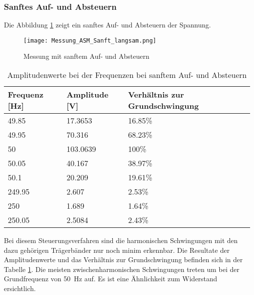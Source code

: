 \newpage
\subsubsection*{Sanftes Auf- und Absteuern}

Die Abbildung \ref{fig:Mess_ASM_Sanft_langsam} zeigt ein sanftes Auf- und Absteuern der Spannung.

\begin{figure}[ht!]
	\centering
	\texttt{[image: Messung\_ASM\_Sanft\_langsam.png]}	
	\caption{Messung mit sanftem Auf- und Absteuern}\label{fig:Mess_ASM_Sanft_langsam}
\end{figure}


\begin{table}[ht!]
	\centering
	\begin{tabular}{|l|l|l|}
		\hline
		Frequenz {[}Hz{]} & Amplitude {[}V{]} & Verhältnis zur Grundschwingung \\ \hline
		49.85             & 17.3653           & 16.85\%                        \\ \hline
		49.95             & 70.316            & 68.23\%                        \\ \hline
		50                & 103.0639          & 100\%                          \\ \hline
		50.05             & 40.167            & 38.97\%                        \\ \hline
		50.1              & 20.209            & 19.61\%                        \\ \hline
		249.95            & 2.607             & 2.53\%                         \\ \hline
		250               & 1.689             & 1.64\%                         \\ \hline
		250.05            & 2.5084            & 2.43\%                         \\ \hline
	\end{tabular}
\caption{Amplitudenwerte bei der Frequenzen bei sanftem Auf- und Absteuern}\label{tab:Mess_Spannung_ASM_AufAb_sanft}
\end{table}


Bei diesem Steuerungsverfahren sind die harmonischen Schwingungen mit den dazu gehörigen Trägerbänder nur noch minim erkennbar. Die Resultate der Amplitudenwerte und das Verhältnis zur Grundschwingung befinden sich in der Tabelle \ref{tab:Mess_Spannung_ASM_AufAb_sanft}. Die meisten zwischenharmonischen Schwingungen treten um bei der Grundfrequenz von \SI{50}{Hz} auf. Es ist eine Ähnlichkeit zum Widerstand ersichtlich.



